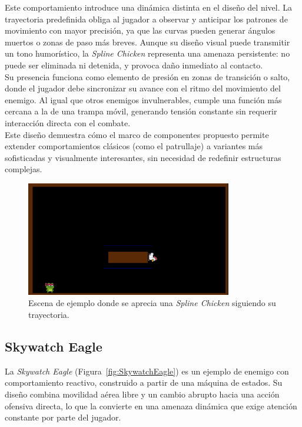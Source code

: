 Este comportamiento introduce una dinámica distinta en el diseño del nivel. La trayectoria predefinida obliga al jugador a observar y anticipar los patrones de movimiento con mayor precisión, ya que las curvas pueden generar ángulos muertos o zonas de paso más breves. Aunque su diseño visual puede transmitir un tono humorístico, la \textit{Spline Chicken} representa una amenaza persistente: no puede ser eliminada ni detenida, y provoca daño inmediato al contacto.\\

Su presencia funciona como elemento de presión en zonas de transición o salto, donde el jugador debe sincronizar su avance con el ritmo del movimiento del enemigo. Al igual que otros enemigos invulnerables, cumple una función más cercana a la de una trampa móvil, generando tensión constante sin requerir interacción directa con el combate.\\

Este diseño demuestra cómo el marco de componentes propuesto permite extender comportamientos clásicos (como el patrullaje) a variantes más sofisticadas y visualmente interesantes, sin necesidad de redefinir estructuras complejas.\\

\begin{figure}[t]
	\centering
	\includegraphics[height=5cm]{Imagenes/Gallina_Spline.png}
	\caption{Escena de ejemplo donde se aprecia una \textit{Spline Chicken} siguiendo su trayectoria.}
	\label{fig:SplineChicken}
\end{figure}

\subsection{Skywatch Eagle}

La \textit{Skywatch Eagle} (Figura~\ref{fig:SkywatchEagle}) es un ejemplo de enemigo con comportamiento reactivo, construido a partir de una máquina de estados. Su diseño combina movilidad aérea libre y un cambio abrupto hacia una acción ofensiva directa, lo que la convierte en una amenaza dinámica que exige atención constante por parte del jugador.\\

